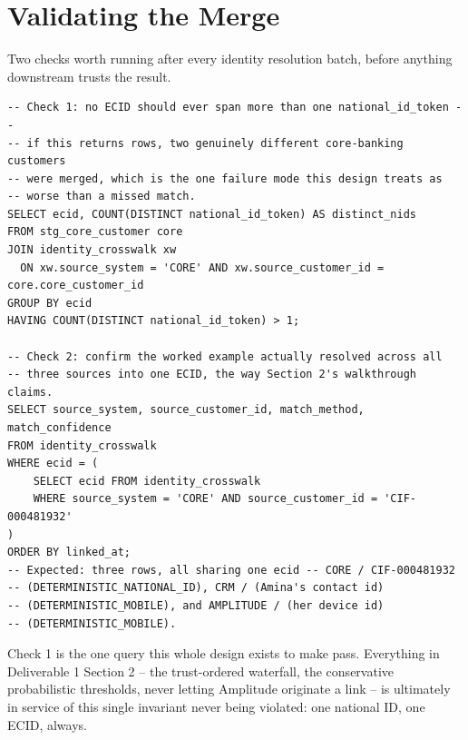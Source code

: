 \documentclass[11pt]{article}
\begin{document}
\section{Validating the Merge}
Two checks worth running after every identity resolution batch, before anything downstream trusts the result.

\begin{lstlisting}[language=PseudoSQL, style=codeblock]
-- Check 1: no ECID should ever span more than one national_id_token --
-- if this returns rows, two genuinely different core-banking customers
-- were merged, which is the one failure mode this design treats as
-- worse than a missed match.
SELECT ecid, COUNT(DISTINCT national_id_token) AS distinct_nids
FROM stg_core_customer core
JOIN identity_crosswalk xw
  ON xw.source_system = 'CORE' AND xw.source_customer_id = core.core_customer_id
GROUP BY ecid
HAVING COUNT(DISTINCT national_id_token) > 1;

-- Check 2: confirm the worked example actually resolved across all
-- three sources into one ECID, the way Section 2's walkthrough claims.
SELECT source_system, source_customer_id, match_method, match_confidence
FROM identity_crosswalk
WHERE ecid = (
    SELECT ecid FROM identity_crosswalk
    WHERE source_system = 'CORE' AND source_customer_id = 'CIF-000481932'
)
ORDER BY linked_at;
-- Expected: three rows, all sharing one ecid -- CORE / CIF-000481932
-- (DETERMINISTIC_NATIONAL_ID), CRM / (Amina's contact id)
-- (DETERMINISTIC_MOBILE), and AMPLITUDE / (her device id)
-- (DETERMINISTIC_MOBILE).
\end{lstlisting}

\begin{rationale}
Check 1 is the one query this whole design exists to make pass. Everything in Deliverable 1 Section 2 -- the trust-ordered waterfall, the conservative probabilistic thresholds, never letting Amplitude originate a link -- is ultimately in service of this single invariant never being violated: one national ID, one ECID, always.
\end{rationale}
\end{document}
